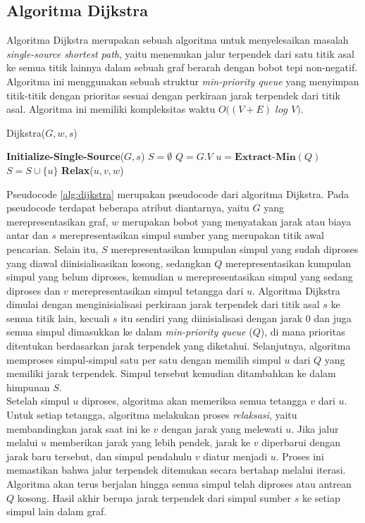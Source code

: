 \subsection{Algoritma Dijkstra ~\cite{Cormen:09:intro}}
\label{sec:dijkstra}
Algoritma Dijkstra merupakan sebuah algoritma untuk menyelesaikan masalah \textit{single-source shortest path}, yaitu menemukan jalur terpendek dari satu titik asal ke semua titik lainnya dalam sebuah graf berarah dengan bobot tepi non-negatif. Algoritma ini menggunakan sebuah struktur \textit{min-priority queue} yang menyimpan titik-titik dengan prioritas sesuai dengan perkiraan jarak terpendek dari titik asal. Algoritma ini memiliki kompleksitas waktu $O((V+E)$ $log$ $V)$.
\begin{algorithm}[H]
    \caption{Dijkstra($G, w, s$)}
    \label{alg:dijkstra}
    \begin{algorithmic}[1]
    \State \textbf{Initialize-Single-Source}($G, s$)
    \State $S = \emptyset$
    \State $Q = G.V$
        \State $u = \textbf{Extract-Min}(Q)$
        \State $S = S \cup \{u\}$
            \State \textbf{Relax}($u, v, w$)
        \EndFor
    \EndWhile
    \end{algorithmic}
\end{algorithm}
\noindent
Pseudocode \ref{alg:dijkstra} merupakan pseudocode dari algoritma Dijkstra. Pada pseudocode terdapat beberapa atribut diantarnya, yaitu $G$ yang merepresentasikan graf, $w$ merupakan bobot yang menyatakan jarak atau biaya antar dan $s$ merepresentasikan simpul sumber yang merupakan titik awal pencarian. Selain itu, $S$ merepresentasikan kumpulan simpul yang sudah diproses yang diawal diinisialisasikan kosong, sedangkan $Q$ merepresentasikan kumpulan simpul yang belum diproses, kemudian $u$ merepresentasikan simpul yang sedang diproses dan $v$ merepresentasikan simpul tetangga dari $u$. Algoritma Dijkstra dimulai dengan menginisialisasi perkiraan jarak terpendek dari titik asal $s$ ke semua titik lain, kecuali $s$ itu sendiri yang diinisialisasi dengan jarak 0 dan juga semua simpul dimasukkan ke dalam \textit{min-priority queue} ($Q$), di mana prioritas ditentukan berdasarkan jarak terpendek yang diketahui. Selanjutnya, algoritma memproses simpul-simpul satu per satu dengan memilih simpul $u$ dari $Q$ yang memiliki jarak terpendek. Simpul tersebut kemudian ditambahkan ke dalam himpunan $S$.
\\
Setelah simpul $u$ diproses, algoritma akan memeriksa semua tetangga $v$ dari $u$. Untuk setiap tetangga, algoritma melakukan proses \textit{relaksasi}, yaitu membandingkan jarak saat ini ke $v$ dengan jarak yang melewati $u$. Jika jalur melalui $u$ memberikan jarak yang lebih pendek, jarak ke $v$ diperbarui dengan jarak baru tersebut, dan simpul pendahulu $v$ diatur menjadi $u$. Proses ini memastikan bahwa jalur terpendek ditemukan secara bertahap melalui iterasi. Algoritma akan terus berjalan hingga semua simpul telah diproses atau antrean $Q$ kosong. Hasil akhir berupa jarak terpendek dari simpul sumber $s$ ke setiap simpul lain dalam graf.
